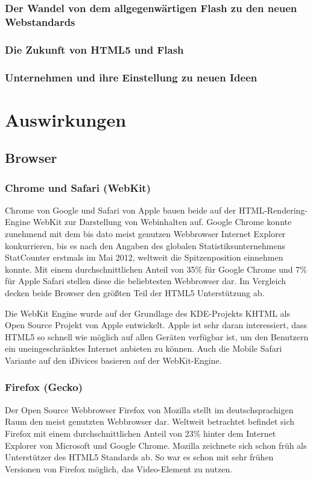 \subsection{Der Wandel von dem allgegenwärtigen Flash zu den neuen Webstandards}
\subsection{Die Zukunft von HTML5 und Flash}
\subsection{Unternehmen und ihre Einstellung zu neuen Ideen}

\chapter{Auswirkungen}
\section{Browser}
\subsection{Chrome und Safari (WebKit)}
Chrome von Google und Safari von Apple bauen beide auf der HTML-Rendering-Engine
WebKit zur Darstellung von Webinhalten auf. Google Chrome konnte zunehmend mit
dem bis dato meist genutzen Webbrowser Internet Explorer konkurrieren, bis es
nach den Angaben des globalen Statistiksunternehmens StatCounter erstmals im Mai
2012, weltweit die Spitzenposition einnehmen konnte. Mit einem
durchschnittlichen Anteil von 35\% für Google Chrome und 7\% für Apple Safari
stellen diese die beliebtesten Webbrowser dar.
Im Vergleich decken beide Browser den größten Teil der HTML5 Unterstützung ab.

Die WebKit Engine wurde auf der Grundlage des KDE-Projekts KHTML als Open Source
Projekt von Apple entwickelt. Apple ist sehr daran interessiert, dass HTML5 so
schnell wie möglich auf allen Geräten verfügbar ist, um den Benutzern ein
uneingeschränktes Internet anbieten zu können. Auch die Mobile Safari Variante
auf den iDivices basieren auf der WebKit-Engine.

\subsection{Firefox (Gecko)}
Der Open Source Webbrowser Firefox von Mozilla stellt im deutschsprachigen Raum
den meist genutzten Webbrowser dar. Weltweit betrachtet befindet sich Firefox
mit einem durchschnittlichen Anteil von 23\% hinter dem Internet Explorer von
Microsoft und Google Chrome.
Mozilla zeichnete sich schon früh als Unterstützer des HTML5 Standards ab. So
war es schon mit sehr frühen Versionen von Firefox möglich, das Video-Element zu
nutzen.

